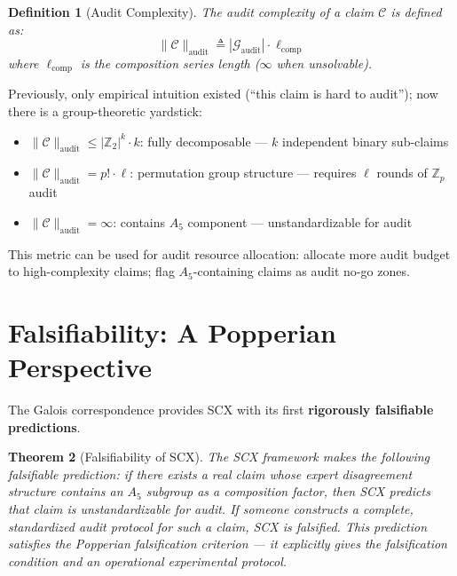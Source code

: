 \documentclass[10pt,a4paper]{article}
\newtheorem{theorem}{Theorem}[section]
\newtheorem{definition}[theorem]{Definition}
\theoremstyle{remark}
\begin{document}
\begin{definition}[Audit Complexity]
The audit complexity of a claim $\mathcal{C}$ is defined as:
\begin{equation}
\|\mathcal{C}\|_{\text{audit}} \triangleq |\mathcal{G}_{\text{audit}}| \cdot \ell_{\text{comp}}
\end{equation}
where $\ell_{\text{comp}}$ is the composition series length ($\infty$ when unsolvable).
\end{definition}

Previously, only empirical intuition existed (``this claim is hard to audit''); now there is a group-theoretic yardstick:
\begin{itemize}
  \item $\|\mathcal{C}\|_{\text{audit}} \le |\mathbb{Z}_2|^k \cdot k$: fully decomposable — $k$ independent binary sub-claims
  \item $\|\mathcal{C}\|_{\text{audit}} = p! \cdot \ell$: permutation group structure — requires $\ell$ rounds of $\mathbb{Z}_p$ audit
  \item $\|\mathcal{C}\|_{\text{audit}} = \infty$: contains $A_5$ component — unstandardizable for audit
\end{itemize}

This metric can be used for audit resource allocation: allocate more audit budget to high-complexity claims; flag $A_5$-containing claims as audit no-go zones.

\section{Falsifiability: A Popperian Perspective}

The Galois correspondence provides SCX with its first \textbf{rigorously falsifiable predictions}.

\begin{theorem}[Falsifiability of SCX]
The SCX framework makes the following falsifiable prediction: if there exists a real claim whose expert disagreement structure contains an $A_5$ subgroup as a composition factor, then SCX predicts that claim is unstandardizable for audit. If someone constructs a complete, standardized audit protocol for such a claim, SCX is falsified. This prediction satisfies the Popperian falsification criterion — it explicitly gives the falsification condition and an operational experimental protocol.
\end{theorem}
\end{document}
